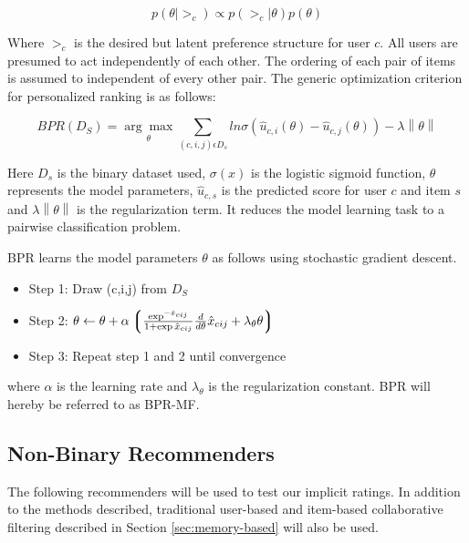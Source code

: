 \begin{equation}
p(\theta | >_c) \propto p(>_c | \theta) p(\theta)
\end{equation}

Where $>_c$ is the desired but latent preference structure for user $c$. All users are presumed to act
independently of each other. The ordering of each pair of items is assumed to independent of every other pair.
The generic optimization criterion for personalized ranking is as follows:

\begin{equation}
BPR(D_S) = \underset{\theta}{\arg\max} \sum_{(c,i,j)\epsilon D_s} ln \sigma(\hat{u}_{c,i}(\theta)-\hat{u}_{c,j}(\theta)) - \lambda \left\|\theta \right\|
\end{equation}

Here $D_s$ is the binary dataset used, $\sigma(x)$ is the logistic sigmoid function, $\theta$ represents
the model parameters, $\hat{u}_{c,s}$ is the predicted score for user $c$ and item $s$ and
$\lambda \left\|\theta \right\|$ is the regularization term. It reduces the model learning task to
a pairwise classification problem.\newline

BPR learns the model parameters $\theta$ as follows using stochastic gradient descent.

\begin{itemize}
\item Step 1: Draw (c,i,j) from $D_S$
\item Step 2: $\theta \leftarrow \theta + \alpha \left\lgroup \frac{\exp^{-\hat{x}_{cij}}}{1+\exp{\hat{x}_{cij}}}  \frac{d}{d \theta} \hat{x}_{cij} + \lambda_{\theta} \theta \right\rgroup$
\item Step 3: Repeat step 1 and 2 until convergence
\end{itemize}

where $\alpha$ is the learning rate and $\lambda_{\theta}$ is the regularization constant. BPR will hereby be
referred to as BPR-MF.

\subsection{Non-Binary Recommenders}

The following recommenders will be used to test our implicit ratings. In addition to the methods described,
traditional user-based and item-based collaborative filtering described in Section \ref{sec:memory-based} will
also be used.

